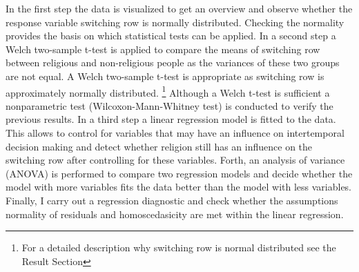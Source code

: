 \documentclass[10pt,a4paper]{article}
\begin{document}



In the first step the data is visualized to get an overview and observe whether the response variable switching row is normally distributed. Checking the normality provides the basis on which statistical tests can be applied. 
In a second step a Welch two-sample t-test is applied to compare the means of switching row between religious and non-religious people as the variances of these two groups are not equal. A Welch two-sample t-test is appropriate as switching row is approximately normally distributed. \footnote{For a detailed description why switching row is normal distributed see the Result Section} Although a Welch t-test is sufficient a nonparametric test (Wilcoxon-Mann-Whitney test) is conducted to verify the previous results.
In a third step a linear regression model is fitted to the data. This allows to control for variables that may have an influence on intertemporal decision making and detect whether religion still has an influence on the switching row after controlling for these variables. Forth, an analysis of variance (ANOVA) is performed to compare two regression models and decide whether the  model with more variables fits the data better than the model with less variables. Finally, I carry out a regression diagnostic and check whether the assumptions normality of residuals and  homoscedasicity are met within the linear regression.\\  
\end{document}
